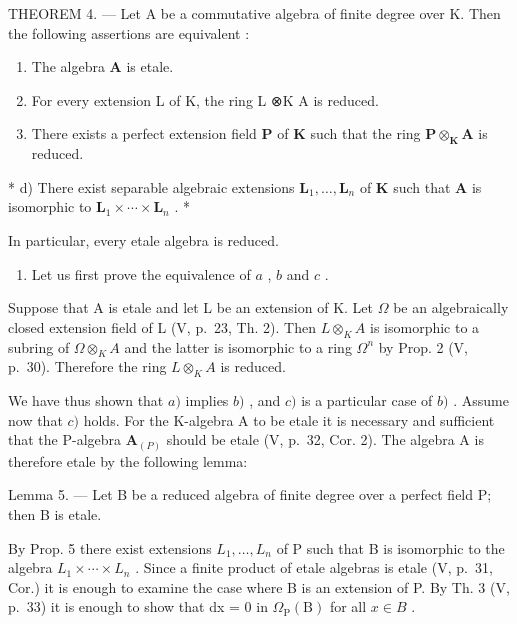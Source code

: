 THEOREM 4. --- Let A be a commutative algebra of finite degree over K. Then the following assertions are equivalent :

\begin{enumerate}
\def\labelenumi{\alph{enumi})}
\item
  The algebra \(\mathbf{A}\) is etale.
\item
  For every extension L of K, the ring L ⊗K A is reduced.
\item
  There exists a perfect extension field \(\mathbf{P}\) of \(\mathbf{K}\) such that the ring \(\mathbf{P} \otimes_{\mathbf{K}} \mathbf{A}\) is reduced.
\end{enumerate}

* d) There exist separable algebraic extensions \(\mathbf{L}_1, \ldots, \mathbf{L}_n\) of \(\mathbf{K}\) such that \(\mathbf{A}\) is isomorphic to \(\mathbf{L}_1 \times \cdots \times \mathbf{L}_n\) . *

In particular, every etale algebra is reduced.

\begin{enumerate}
\def\labelenumi{\Alph{enumi})}
\tightlist
\item
  Let us first prove the equivalence of \(a\) , \(b\) and \(c\) .
\end{enumerate}

Suppose that A is etale and let L be an extension of K. Let \(\Omega\) be an algebraically closed extension field of L (V, p.~23, Th. 2). Then \(L \otimes_{K} A\) is isomorphic to a subring of \(\Omega \otimes_{K} A\) and the latter is isomorphic to a ring \(\Omega^{n}\) by Prop. 2 (V, p.~30). Therefore the ring \(L \otimes_{K} A\) is reduced.

We have thus shown that \(a)\) implies \(b)\) , and \(c)\) is a particular case of \(b)\) . Assume now that \(c)\) holds. For the K-algebra A to be etale it is necessary and sufficient that the P-algebra \(\mathbf{A}_{(P)}\) should be etale (V, p.~32, Cor. 2). The algebra A is therefore etale by the following lemma:

Lemma 5. --- Let B be a reduced algebra of finite degree over a perfect field P; then B is etale.

By Prop. 5 there exist extensions \(L_{1}, \ldots, L_{n}\) of P such that B is isomorphic to the algebra \(L_{1} \times \cdots \times L_{n}\) . Since a finite product of etale algebras is etale (V, p.~31, Cor.) it is enough to examine the case where B is an extension of P. By Th. 3 (V, p.~33) it is enough to show that dx = 0 in \(\Omega_{\mathrm{P}}(\mathrm{B})\) for all \(x \in B\) .

